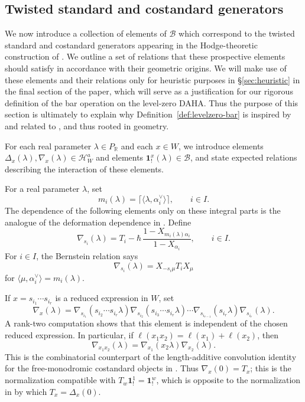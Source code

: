 \documentclass{amsart}
\newcommand{\bone}{\mathbf{1}}
\newcommand{\Ha}{\mathcal{H}_{W}^a}
\newcommand{\B}{\mathcal{B}}
\theoremstyle{definition}
\numberwithin{equation}{section}
\begin{document}
\subsection{Twisted standard and costandard generators}\label{sec:twisted-generators}

We now introduce a collection of elements of $\mathcal{B}$ which correspond to the twisted
standard and costandard generators appearing in the Hodge-theoretic construction of
\cite[\S 3.2--3.3]{DMB}. We outline a set of relations that these prospective elements should satisfy in accordance with their geometric origins. We will make use of these elements and their relations only for heuristic purposes in \S\ref{sec:heuristic} in the final section of the paper, which will serve as a justification for our rigorous definition of the bar operation on the level-zero DAHA. Thus the purpose of this section is ultimately to explain why Definition~\ref{def:levelzero-bar} is inspired by and related to \cite{DMB}, and thus rooted in geometry.

For each real parameter \(\lambda\in P_{\mathbb R}\) and each
\(x\in W\), we introduce elements \(\Delta_x(\lambda), \nabla_x(\lambda) \in \Ha\) and  elements
\(\bone_!^x(\lambda)\in \B\), and state expected relations describing the interaction of these elements.

For a real parameter \(\lambda\), set
\[
m_i(\lambda)=\lceil\langle\lambda,\alpha_i^\vee\rangle\rceil,
\qquad i\in I.
\]
The dependence of the following elements only on these integral parts is the analogue of the
deformation dependence in \cite[Theorem~3.13(1)]{DMB}. Define
\begin{equation}\label{eq:affine-simple-factor}
\nabla_{s_i}(\lambda)
=
T_i-\hbar\,\frac{1-X_{m_i(\lambda)\alpha_i}}
{1-X_{\alpha_i}},
\qquad i\in I.
\end{equation}
For \(i\in I\), the Bernstein relation says
\[
\nabla_{s_i}(\lambda)=X_{-s_i\mu}T_iX_{\mu}\]
for $\langle\mu,\alpha_i^\vee\rangle=m_i(\lambda).$

If \(x=s_{i_1}\cdots s_{i_r}\) is a reduced expression in
\(W\), set
\begin{equation}\label{eq:affine-twisted-costandard-general}
\nabla_x(\lambda)
=
\nabla_{s_{i_1}}(s_{i_2}\cdots s_{i_r}\lambda)
\nabla_{s_{i_2}}(s_{i_3}\cdots s_{i_r}\lambda)
\cdots
\nabla_{s_{i_{r-1}}}(s_{i_r}\lambda)
\nabla_{s_{i_r}}(\lambda).
\end{equation}
A rank-two computation shows that this element is independent of the
chosen reduced expression. In particular, if
\(\ell(x_1x_2)=\ell(x_1)+\ell(x_2)\), then
\begin{equation}\label{eq:twisted-generator-multiplicativity}
\nabla_{x_1x_2}(\lambda)=\nabla_{x_1}(x_2\lambda)\nabla_{x_2}(\lambda).
\end{equation}
This is the combinatorial counterpart of the length-additive convolution
identity for the free-monodromic costandard objects in
\cite[Theorem~3.12(1)]{DMB}. Thus \(\nabla_x(0)=T_x\); this is the normalization compatible with \(T_w\bone_!^1=\bone_!^w\), which is opposite to the normalization in \cite{DMB} by which \( T_x = \Delta_x(0)\).
\end{document}
